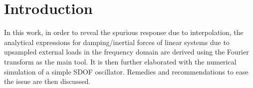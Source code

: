 \section{Introduction}
In this work, in order to reveal the spurious response due to interpolation, the analytical expressions for damping/inertial forces of linear systems due to upsampled external loads in the frequency domain are derived using the Fourier transform as the main tool. It is then further elaborated with the numerical simulation of a simple SDOF oscillator. Remedies and recommendations to ease the issue are then discussed.